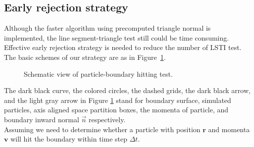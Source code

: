 \documentclass[a4paper,11pt]{article}
\begin{document}
\subsection{Early rejection strategy}
Although the faster algorithm using precomputed triangle normal is implemented, the line segment-triangle test still could be time consuming. Effective early rejection strategy is needed to reduce the number of LSTI test. The basic schemes of our strategy are as in Figure~\ref{fig:P-B}.
\begin{figure}[H]
\begin{center}

\end{center}
\caption{Schematic view of particle-boundary hitting test.\label{fig:P-B}}
\end{figure}
The dark black curve, the colored circles, the dashed grids, the dark black arrow,  and the light gray arrow in Figure \ref{fig:P-B} stand for boundary surface, simulated particles, axis aligned space partition boxes, the momenta of particle, and boundary inward normal $\vec{n}$ respectively.\\

Assuming we need to determine whether a particle with position $\mathbf{r}$ and momenta $\mathbf{v}$ will hit the boundary within time step $\Delta{t}$.\\ 
\end{document}
